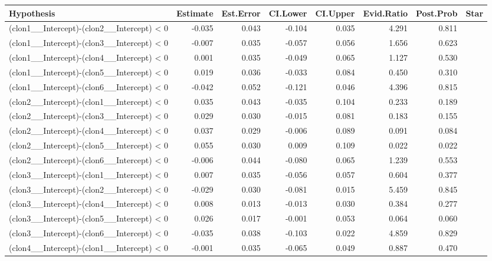 \begin{table}[ht]
\centering
\begin{tabular}{lrrrrrrl}
  \hline
Hypothesis & Estimate & Est.Error & CI.Lower & CI.Upper & Evid.Ratio & Post.Prob & Star \\ 
  \hline
(clon1__Intercept)-(clon2__Intercept) < 0 & -0.035 & 0.043 & -0.104 & 0.035 & 4.291 & 0.811 &  \\ 
  (clon1__Intercept)-(clon3__Intercept) < 0 & -0.007 & 0.035 & -0.057 & 0.056 & 1.656 & 0.623 &  \\ 
  (clon1__Intercept)-(clon4__Intercept) < 0 & 0.001 & 0.035 & -0.049 & 0.065 & 1.127 & 0.530 &  \\ 
  (clon1__Intercept)-(clon5__Intercept) < 0 & 0.019 & 0.036 & -0.033 & 0.084 & 0.450 & 0.310 &  \\ 
  (clon1__Intercept)-(clon6__Intercept) < 0 & -0.042 & 0.052 & -0.121 & 0.046 & 4.396 & 0.815 &  \\ 
  (clon2__Intercept)-(clon1__Intercept) < 0 & 0.035 & 0.043 & -0.035 & 0.104 & 0.233 & 0.189 &  \\ 
  (clon2__Intercept)-(clon3__Intercept) < 0 & 0.029 & 0.030 & -0.015 & 0.081 & 0.183 & 0.155 &  \\ 
  (clon2__Intercept)-(clon4__Intercept) < 0 & 0.037 & 0.029 & -0.006 & 0.089 & 0.091 & 0.084 &  \\ 
  (clon2__Intercept)-(clon5__Intercept) < 0 & 0.055 & 0.030 & 0.009 & 0.109 & 0.022 & 0.022 &  \\ 
  (clon2__Intercept)-(clon6__Intercept) < 0 & -0.006 & 0.044 & -0.080 & 0.065 & 1.239 & 0.553 &  \\ 
  (clon3__Intercept)-(clon1__Intercept) < 0 & 0.007 & 0.035 & -0.056 & 0.057 & 0.604 & 0.377 &  \\ 
  (clon3__Intercept)-(clon2__Intercept) < 0 & -0.029 & 0.030 & -0.081 & 0.015 & 5.459 & 0.845 &  \\ 
  (clon3__Intercept)-(clon4__Intercept) < 0 & 0.008 & 0.013 & -0.013 & 0.030 & 0.384 & 0.277 &  \\ 
  (clon3__Intercept)-(clon5__Intercept) < 0 & 0.026 & 0.017 & -0.001 & 0.053 & 0.064 & 0.060 &  \\ 
  (clon3__Intercept)-(clon6__Intercept) < 0 & -0.035 & 0.038 & -0.103 & 0.022 & 4.859 & 0.829 &  \\ 
  (clon4__Intercept)-(clon1__Intercept) < 0 & -0.001 & 0.035 & -0.065 & 0.049 & 0.887 & 0.470 &  \\ 

\end{tabular}
\end{table}
